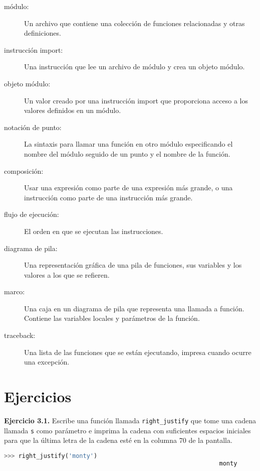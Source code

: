 \begin{description}
\item[módulo:] Un archivo que contiene una colección de funciones relacionadas y otras definiciones.

\item[instrucción import:] Una instrucción que lee un archivo de módulo y crea un objeto módulo.

\item[objeto módulo:] Un valor creado por una instrucción import que proporciona acceso a los valores definidos en un módulo.

\item[notación de punto:] La sintaxis para llamar una función en otro módulo especificando el nombre del módulo seguido de un punto y el nombre de la función.

\item[composición:] Usar una expresión como parte de una expresión más grande, o una instrucción como parte de una instrucción más grande.

\item[flujo de ejecución:] El orden en que se ejecutan las instrucciones.

\item[diagrama de pila:] Una representación gráfica de una pila de funciones, sus variables y los valores a los que se refieren.

\item[marco:] Una caja en un diagrama de pila que representa una llamada a función. Contiene las variables locales y parámetros de la función.

\item[traceback:] Una lista de las funciones que se están ejecutando, impresa cuando ocurre una excepción.
\end{description}

\section{Ejercicios}

\textbf{Ejercicio 3.1.} Escribe una función llamada \texttt{right\_justify} que tome una cadena llamada \texttt{s} como parámetro e imprima la cadena con suficientes espacios iniciales para que la última letra de la cadena esté en la columna 70 de la pantalla.

\begin{lstlisting}[language=Python]
>>> right_justify('monty')
                                                            monty
\end{lstlisting}

